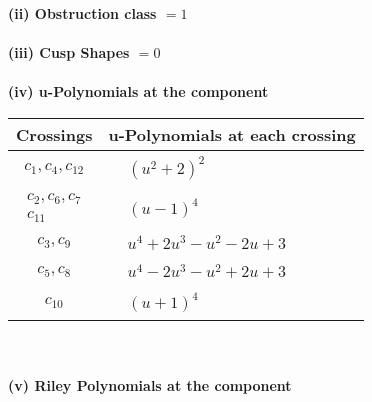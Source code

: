 \documentclass[1p]{elsarticle_modified}
\theoremstyle{definition}
\begin{document}
\flushleft \textbf{(ii) Obstruction class $= 1$}\\~\\
\flushleft \textbf{(iii) Cusp Shapes $= 0$}\\~\\
\newpage\renewcommand{\arraystretch}{1}
\flushleft \textbf{(iv) u-Polynomials at the component}\newline \\
\begin{tabular}{m{50pt}|m{274pt}}
Crossings & \hspace{64pt}u-Polynomials at each crossing \\
\hline $$\begin{aligned}c_{1},c_{4},c_{12}\end{aligned}$$&$\begin{aligned}
&(u^2+2)^2
\end{aligned}$\\
\hline $$\begin{aligned}c_{2},c_{6},c_{7}\\c_{11}\end{aligned}$$&$\begin{aligned}
&(u-1)^4
\end{aligned}$\\
\hline $$\begin{aligned}c_{3},c_{9}\end{aligned}$$&$\begin{aligned}
&u^4+2 u^3- u^2-2 u+3
\end{aligned}$\\
\hline $$\begin{aligned}c_{5},c_{8}\end{aligned}$$&$\begin{aligned}
&u^4-2 u^3- u^2+2 u+3
\end{aligned}$\\
\hline $$\begin{aligned}c_{10}\end{aligned}$$&$\begin{aligned}
&(u+1)^4
\end{aligned}$\\
\hline
\end{tabular}\\~\\
\newpage\renewcommand{\arraystretch}{1}
\flushleft \textbf{(v) Riley Polynomials at the component}\newline \\
\end{document}
